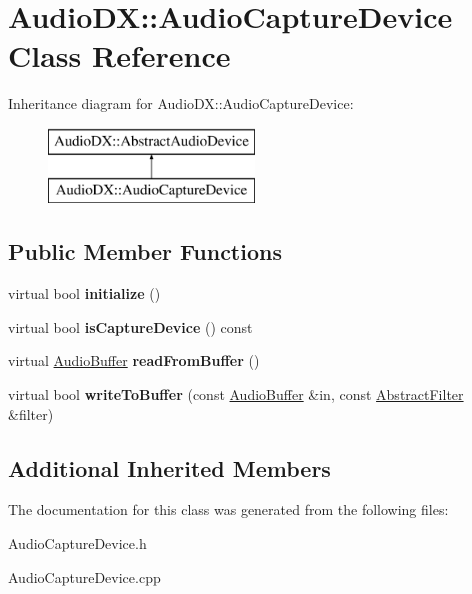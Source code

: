 \hypertarget{class_audio_d_x_1_1_audio_capture_device}{\section{Audio\-D\-X\-:\-:Audio\-Capture\-Device Class Reference}
\label{class_audio_d_x_1_1_audio_capture_device}
}
Inheritance diagram for Audio\-D\-X\-:\-:Audio\-Capture\-Device\-:\begin{figure}[H]
\begin{center}
\leavevmode
\includegraphics[height=2.000000cm]{class_audio_d_x_1_1_audio_capture_device}
\end{center}
\end{figure}
\subsection*{Public Member Functions}
\begin{DoxyCompactItemize}
\item 
\hypertarget{class_audio_d_x_1_1_audio_capture_device_ac250657c952e2d6b444f02437f1794e7}{virtual bool {\bfseries initialize} ()}\label{class_audio_d_x_1_1_audio_capture_device_ac250657c952e2d6b444f02437f1794e7}

\item 
\hypertarget{class_audio_d_x_1_1_audio_capture_device_af103510b605a3f09f45c9168a8314c2a}{virtual bool {\bfseries is\-Capture\-Device} () const }\label{class_audio_d_x_1_1_audio_capture_device_af103510b605a3f09f45c9168a8314c2a}

\item 
\hypertarget{class_audio_d_x_1_1_audio_capture_device_a9472d2ee1453fb8c57963ef4553a1c5e}{virtual \hyperlink{class_audio_d_x_1_1_audio_buffer}{Audio\-Buffer} {\bfseries read\-From\-Buffer} ()}\label{class_audio_d_x_1_1_audio_capture_device_a9472d2ee1453fb8c57963ef4553a1c5e}

\item 
\hypertarget{class_audio_d_x_1_1_audio_capture_device_a5fc7fb3e7236fd71240a0bd238564a83}{virtual bool {\bfseries write\-To\-Buffer} (const \hyperlink{class_audio_d_x_1_1_audio_buffer}{Audio\-Buffer} \&in, const \hyperlink{struct_audio_d_x_1_1_abstract_filter}{Abstract\-Filter} \&filter)}\label{class_audio_d_x_1_1_audio_capture_device_a5fc7fb3e7236fd71240a0bd238564a83}

\end{DoxyCompactItemize}
\subsection*{Additional Inherited Members}


The documentation for this class was generated from the following files\-:\begin{DoxyCompactItemize}
\item 
Audio\-Capture\-Device.\-h\item 
Audio\-Capture\-Device.\-cpp\end{DoxyCompactItemize}
